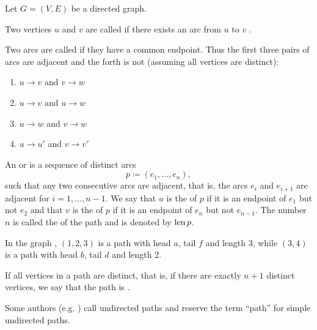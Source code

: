 \begin{definition}\label{def:graph_paths}
  Let \( G = (V, E) \) be a directed graph.

  \begin{defenum}
     Two vertices \( u \)  and \( v \)  are called  if there exists an arc from \( u \)  to \( v \) .

    \cite[chapter 1, section 1.4]{Gondran1984} Two arcs are called  if they have a common endpoint. Thus the first three pairs of arcs are adjacent and the forth is not (assuming all vertices are distinct):
    \begin{enumerate}
      \item \( u \to v \) and \( v \to w \)
      \item \( u \to v \) and \( u \to w \)
      \item \( u \to w \) and \( v \to w \)
      \item \( u \to u' \) and \( v \to v' \)
    \end{enumerate}

    \cite[chapter 1, section 3.1]{Gondran1984} An  or  is a sequence of distinct arcs
    \begin{equation*}
      p \coloneqq ( e_1, \ldots, e_n ),
    \end{equation*}
    such that any two consecutive arcs are adjacent, that is, the arcs \( e_i \) and \( e_{i+1} \) are adjacent for \( i = 1, \ldots, n - 1 \). We say that \( u \) is the  of \( p \) if it is an endpoint of \( e_1 \) but not \( e_2 \) and that \( v \) is the  of \( p \) if it is an endpoint of \( e_n \) but not \( e_{n-1} \). The number $n$ is called the  of the path and is denoted by \( \operatorname{len} p \).

    In the graph , \( (1, 2, 3) \) is a path with head \( a \), tail \( f \) and length 3, while \( (3, 4) \) is a path with head \( b \), tail \( d \) and length 2.

    If all vertices in a path are distinct, that is, if there are exactly $n + 1$ distinct vertices, we say that the path is .

    Some authors (e.g. \cite[section 5.2]{Erickson2019}) call undirected paths  and reserve the term \enquote{path} for simple undirected paths.


\end{defenum}
\end{definition}
